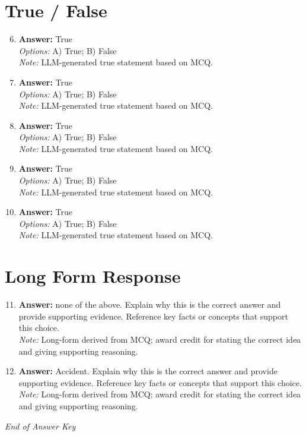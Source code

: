\documentclass[12pt]{article}
\begin{document}
\section*{True / False}
\begin{enumerate}[label=\arabic*.]
\setcounter{enumi}{5}
\item \textbf{Answer:} True
\\ \textit{Options:} A) True; B) False
\\ \textit{Note:} LLM-generated true statement based on MCQ.
\item \textbf{Answer:} True
\\ \textit{Options:} A) True; B) False
\\ \textit{Note:} LLM-generated true statement based on MCQ.
\item \textbf{Answer:} True
\\ \textit{Options:} A) True; B) False
\\ \textit{Note:} LLM-generated true statement based on MCQ.
\item \textbf{Answer:} True
\\ \textit{Options:} A) True; B) False
\\ \textit{Note:} LLM-generated true statement based on MCQ.
\item \textbf{Answer:} True
\\ \textit{Options:} A) True; B) False
\\ \textit{Note:} LLM-generated true statement based on MCQ.
\end{enumerate}

\section*{Long Form Response}
\begin{enumerate}[label=\arabic*.]
\setcounter{enumi}{10}
\item \textbf{Answer:} none of the above. Explain why this is the correct answer and provide supporting evidence. Reference key facts or concepts that support this choice.
\\ \textit{Note:} Long-form derived from MCQ; award credit for stating the correct idea and giving supporting reasoning.
\item \textbf{Answer:} Accident. Explain why this is the correct answer and provide supporting evidence. Reference key facts or concepts that support this choice.
\\ \textit{Note:} Long-form derived from MCQ; award credit for stating the correct idea and giving supporting reasoning.
\end{enumerate}

\vfill
\noindent\textit{End of Answer Key}
\end{document}
